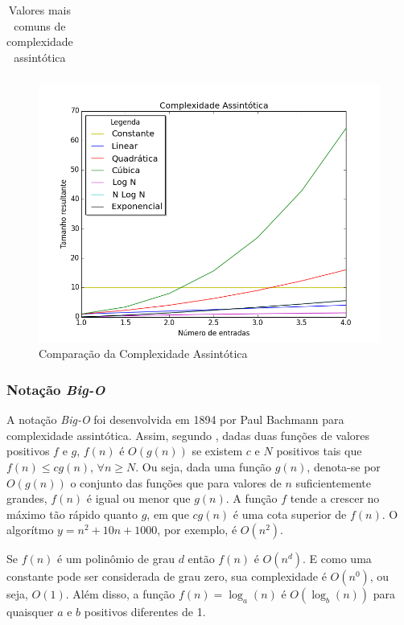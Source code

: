 {\begin{table}[ht]
\begin{tabularx}{0.9\textwidth}{cX}
		\bottomrule
	\end{tabularx}
	\caption{ Valores mais comuns de complexidade assintótica}
	\label{complexidadeAlgoritmica}
\end{table}


	\begin{figure}[ht]
	\centering
		\includegraphics[keepaspectratio=true,scale=0.4]{figuras/compalg.png}
	\caption{Comparação da Complexidade Assintótica}
	\label{compalg}
	\end{figure}

	\subsubsection{Notação \textit{Big-O}}

	
	A notação \textit{Big-O} foi desenvolvida em 1894 por Paul Bachmann para complexidade assintótica. Assim, segundo \cite{complexidade}, dadas duas funções de valores positivos $f$ e $g$, $f(n)$ é $O(g(n))$ se existem $c$ e $N$ positivos tais que $f(n) \leq cg(n)$, $\forall n \geq N$. Ou seja, dada uma função $g(n)$, denota-se por $O(g(n))$ o conjunto das funções que para valores de $n$ suficientemente grandes, $f(n)$ é igual ou menor que $g(n)$. A função $f$ tende a crescer no máximo tão rápido quanto $g$, em que $cg(n)$ é uma cota superior de $f(n)$. O algorítmo $y = n^{2} +10 n + 1000$, por exemplo, é $O(n^2)$. 

	Se $f(n)$ é um polinômio de grau $d$  então $f(n)$ é $O(n^d)$. E como uma constante pode ser considerada de grau zero, sua complexidade é $O(n^0)$, ou seja, $O(1)$. Além disso, a função $f(n) = \log _a \left( n \right)$ é $O(\log _b \left( n \right))$ para quaisquer $a$ e $b$ positivos diferentes de 1. 

}
